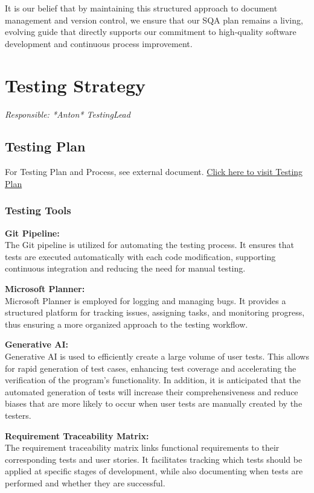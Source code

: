 \documentclass{article}
\begin{document}
It is our belief that by maintaining this structured approach to document management and version control, we ensure that our SQA plan remains a living, evolving guide that directly supports our commitment to high-quality software development and continuous process improvement.

\newpage
\section{Testing Strategy}
\textit{Responsible: *Anton* TestingLead}

\subsection{Testing Plan}
For Testing Plan and Process, see external document. \href{https://www.overleaf.com/project/66ff9154fca1f68722259739}{Click here to visit Testing Plan}


\subsubsection{Testing Tools}

\textbf{Git Pipeline:} \\
The Git pipeline is utilized for automating the testing process. It ensures that tests are executed automatically with each code modification, supporting continuous integration and reducing the need for manual testing.

\textbf{Microsoft Planner:}\\ 
Microsoft Planner is employed for logging and managing bugs. It provides a structured platform for tracking issues, assigning tasks, and monitoring progress, thus ensuring a more organized approach to the testing workflow.

\textbf{Generative AI:}\\
Generative AI is used to efficiently create a large volume of user tests. This allows for rapid generation of test cases, enhancing test coverage and accelerating the verification of the program’s functionality. In addition, it is anticipated that the automated generation of tests will increase their comprehensiveness and reduce biases that are more likely to occur when user tests are manually created by the testers.

\textbf{Requirement Traceability Matrix:} \\
The requirement traceability matrix links functional requirements to their corresponding tests and user stories. It facilitates tracking which tests should be applied at specific stages of development, while also documenting when tests are performed and whether they are successful.
\end{document}
